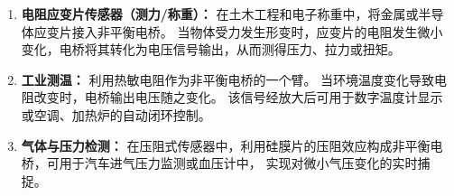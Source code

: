 \documentclass{../../templates/Report}%
\begin{document}
\begin{fullreportonly}
    \begin{enumerate}
        \item \textbf{电阻应变片传感器（测力/称重）：}
              在土木工程和电子称重中，将金属或半导体应变片接入非平衡电桥。
              当物体受力发生形变时，应变片的电阻发生微小变化，电桥将其转化为电压信号输出，从而测得压力、拉力或扭矩。
        \item \textbf{工业测温：}
              利用热敏电阻作为非平衡电桥的一个臂。
              当环境温度变化导致电阻改变时，电桥输出电压随之变化。
              该信号经放大后可用于数字温度计显示或空调、加热炉的自动闭环控制。
        \item \textbf{气体与压力检测：}
              在压阻式传感器中，利用硅膜片的压阻效应构成非平衡电桥，可用于汽车进气压力监测或血压计中，
              实现对微小气压变化的实时捕捉。
    \end{enumerate}
\end{fullreportonly}
\insertnotes
\end{document}
